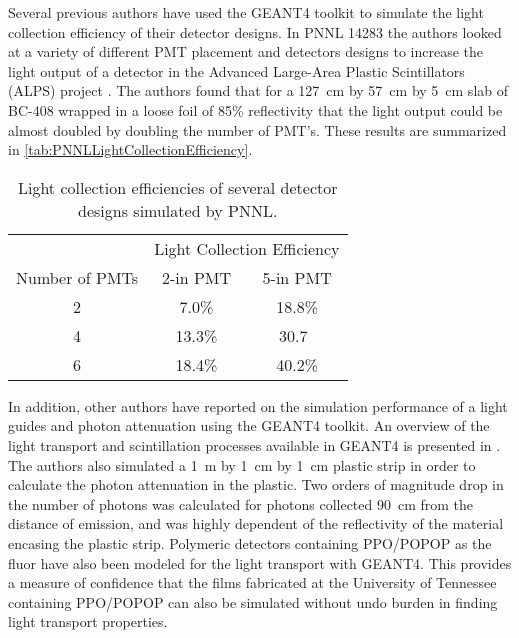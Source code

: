 Several previous authors have used the GEANT4 toolkit to simulate the light collection efficiency of their detector designs.
In PNNL 14283 the authors looked at a variety of different PMT placement and detectors designs to increase the light output of a detector in the Advanced Large-Area Plastic Scintillators (ALPS) project \cite{pnnl_14283}.
The authors found that for a \SI{127}{\cm} by \SI{57}{\cm} by \SI{5}{\cm} slab of BC-408 wrapped in a loose foil of 85\% reflectivity that the light output could be almost doubled by doubling the number of PMT's.
These results are summarized in \autoref{tab:PNNLLightCollectionEfficiency}.
\begin{table}
  \centering
  \caption[PNNL Light Collection Efficiencies]{Light collection efficiencies of several detector designs simulated by PNNL\cite{pnnl_14283}.}
  \label{tab:PNNLLightCollectionEfficiency}
  \begin{tabular}{c|c c}
  \toprule
  & \multicolumn{2}{c}{Light Collection Efficiency} \\
  Number of PMTs  & 2-in PMT & 5-in PMT \\
  \midrule
  2 & 7.0\% & 18.8\% \\
  4 & 13.3\% & 30.7\ \\
  6 & 18.4\% & 40.2\% \\
  \bottomrule
  \end{tabular}
\end{table}
In addition, other authors have reported on the simulation performance of a light guides and photon attenuation using the GEANT4 toolkit.
An overview of the light transport and scintillation processes available in GEANT4 is presented in \cite{riggi_introducing_2011}.
The authors also simulated a \SI{1}{\m} by \SI{1}{\cm} by \SI{1}{\cm} plastic strip in order to calculate the photon attenuation in the plastic.
Two orders of magnitude drop in the number of photons was calculated for photons collected \SI{90}{\cm} from the distance of emission, and was highly dependent of the reflectivity of the material encasing the plastic strip\cite{riggi_introducing_2011}.
Polymeric detectors containing PPO/POPOP as the fluor have also been modeled for the light transport with GEANT4\cite{5485130}.
This provides a measure of confidence that the films fabricated at the University of Tennessee containing PPO/POPOP can also be simulated without undo burden in finding light transport properties.

